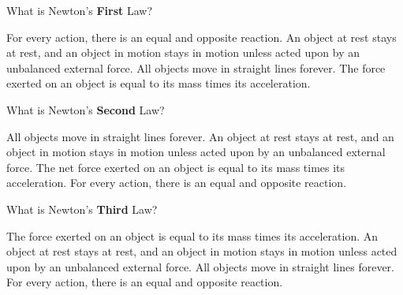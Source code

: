 \begin{questions}
\begin{parts}
\qsp 

\begin{centering}
\end{centering}

\qsp

\end{parts}

\newpage
{}


\question[1] What is Newton's \textbf{First} Law? 

\begin{choices}
\choice For every action, there is an equal and opposite reaction. 
\choice An object at rest stays at rest, and an object in motion stays in motion unless acted upon by an unbalanced external force.
\choice All objects move in straight lines forever.
\choice The force exerted on an object is equal to its mass times its acceleration.
\end{choices}

\qsp

\question[1] What is Newton's \textbf{Second} Law? 

\begin{choices}
\choice All objects move in straight lines forever.
\choice An object at rest stays at rest, and an object in motion stays in motion unless acted upon by an unbalanced external force.
\choice The net force exerted on an object is equal to its mass times its acceleration.
\choice For every action, there is an equal and opposite reaction.
\end{choices}

\qsp

\question[1] What is Newton's \textbf{Third} Law? 

\begin{choices}
\choice The force exerted on an object is equal to its mass times its acceleration.
\choice An object at rest stays at rest, and an object in motion stays in motion unless acted upon by an unbalanced external force.
\choice All objects move in straight lines forever.
\choice For every action, there is an equal and opposite reaction.
\end{choices}


\end{questions}

